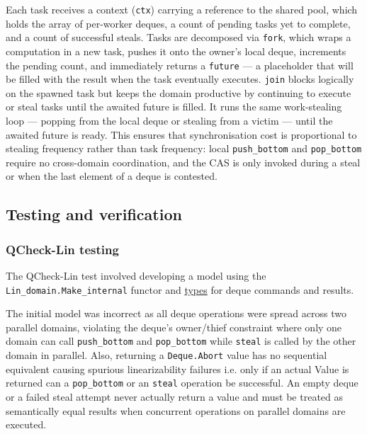 \documentclass[11pt,a4paper]{article}
\begin{document}
Each task receives a context (\texttt{ctx}) carrying a reference to the
shared pool, which holds the array of per-worker deques, a count of pending
tasks yet to complete, and a count of successful steals. Tasks are decomposed
via \texttt{fork}, which wraps a computation in a new task, pushes it onto
the owner's local deque, increments the pending count, and immediately returns
a \texttt{future} — a placeholder that will be filled with the result when the
task eventually executes.  \texttt{join} blocks logically on the spawned task
but keeps the domain productive by continuing to execute or steal tasks until
the awaited future is filled. It runs the same work-stealing loop — popping
from the local deque or stealing from a victim — until the awaited future is ready.
This ensures that synchronisation cost is proportional to stealing
frequency rather than task frequency: local \texttt{push\_bottom} and
\texttt{pop\_bottom} require no cross-domain coordination, and the
CAS is only invoked during a steal or when the last element of a deque is contested.

\subsection{Testing and verification}

\subsubsection{QCheck-Lin testing}

The QCheck-Lin test involved developing a model using the
\texttt{Lin\_domain.Make\_internal} functor and
\href{https://github.com/alinab/work-steal/commit/72b74275fa8f5eea6dbacc489cae87db9900cfc9}{
types} for deque commands and results.

The initial model was incorrect as all deque operations were spread across
two parallel domains, violating the deque's owner/thief constraint where only
one domain can call \texttt{push\_bottom} and \texttt{pop\_bottom}
while \texttt{steal} is called by the other domain in parallel. Also,
returning a \texttt{Deque.Abort} value has no sequential equivalent causing
spurious linearizability failures i.e. only if an
actual Value is returned can a \texttt{pop\_bottom} or an \texttt{steal}
operation be successful. An empty deque or a failed steal attempt never
actually return a value and must be treated as semantically equal results
when concurrent operations on parallel domains are executed.
\end{document}
